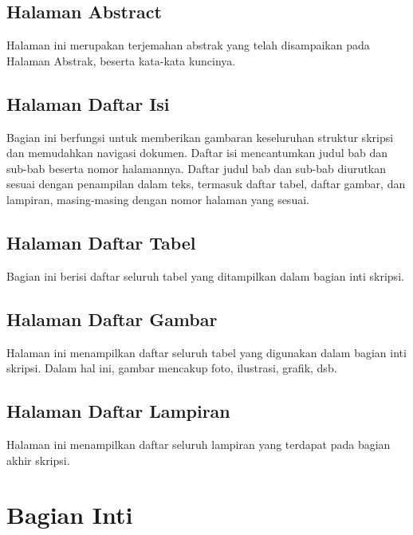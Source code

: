 \documentclass[
  indonesian,
  letterpaper,
]{scrbook}
\begin{document}
\subsection{Halaman Abstract}\label{halaman-abstract}

Halaman ini merupakan terjemahan abstrak yang telah disampaikan pada
Halaman Abstrak, beserta kata-kata kuncinya.

\subsection{Halaman Daftar Isi}\label{halaman-daftar-isi}

Bagian ini berfungsi untuk memberikan gambaran keseluruhan struktur
skripsi dan memudahkan navigasi dokumen. Daftar isi mencantumkan judul
bab dan sub-bab beserta nomor halamannya. Daftar judul bab dan sub-bab
diurutkan sesuai dengan penampilan dalam teks, termasuk daftar tabel,
daftar gambar, dan lampiran, masing-masing dengan nomor halaman yang
sesuai.

\subsection{Halaman Daftar Tabel}\label{halaman-daftar-tabel}

Bagian ini berisi daftar seluruh tabel yang ditampilkan dalam bagian
inti skripsi.

\subsection{Halaman Daftar Gambar}\label{halaman-daftar-gambar}

Halaman ini menampilkan daftar seluruh tabel yang digunakan dalam bagian
inti skripsi. Dalam hal ini, gambar mencakup foto, ilustrasi, grafik,
dsb.

\subsection{Halaman Daftar Lampiran}\label{halaman-daftar-lampiran}

Halaman ini menampilkan daftar seluruh lampiran yang terdapat pada
bagian akhir skripsi.

\section{Bagian Inti}\label{bagian-inti}
\end{document}
